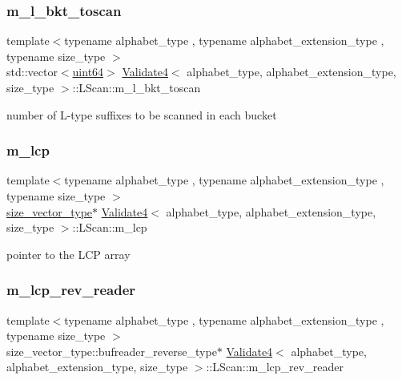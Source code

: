 \subsubsection{\texorpdfstring{m\+\_\+l\+\_\+bkt\+\_\+toscan}{m\_l\_bkt\_toscan}}
{\footnotesize\ttfamily template$<$typename alphabet\+\_\+type , typename alphabet\+\_\+extension\+\_\+type , typename size\+\_\+type $>$ \\
std\+::vector$<$\hyperlink{types_8h_a60e8696a4678cd348e991a1f172e53f7}{uint64}$>$ \hyperlink{class_validate4}{Validate4}$<$ alphabet\+\_\+type, alphabet\+\_\+extension\+\_\+type, size\+\_\+type $>$\+::L\+Scan\+::m\+\_\+l\+\_\+bkt\+\_\+toscan\hspace{0.3cm}{\ttfamily [private]}}



number of L-\/type suffixes to be scanned in each bucket 

\mbox{\label{struct_validate4_1_1_l_scan_af9ba74080cb7b3e0f685d29a4c78ab73}} 
\subsubsection{\texorpdfstring{m\+\_\+lcp}{m\_lcp}}
{\footnotesize\ttfamily template$<$typename alphabet\+\_\+type , typename alphabet\+\_\+extension\+\_\+type , typename size\+\_\+type $>$ \\
\hyperlink{class_validate4_a46ea31a0a4b23f583806792160421d15}{size\+\_\+vector\+\_\+type}$\ast$ \hyperlink{class_validate4}{Validate4}$<$ alphabet\+\_\+type, alphabet\+\_\+extension\+\_\+type, size\+\_\+type $>$\+::L\+Scan\+::m\+\_\+lcp\hspace{0.3cm}{\ttfamily [private]}}



pointer to the L\+CP array 

\mbox{\label{struct_validate4_1_1_l_scan_ad46060df61e67075c4dd51ef65b4fbe1}} 
\subsubsection{\texorpdfstring{m\+\_\+lcp\+\_\+rev\+\_\+reader}{m\_lcp\_rev\_reader}}
{\footnotesize\ttfamily template$<$typename alphabet\+\_\+type , typename alphabet\+\_\+extension\+\_\+type , typename size\+\_\+type $>$ \\
size\+\_\+vector\+\_\+type\+::bufreader\+\_\+reverse\+\_\+type$\ast$ \hyperlink{class_validate4}{Validate4}$<$ alphabet\+\_\+type, alphabet\+\_\+extension\+\_\+type, size\+\_\+type $>$\+::L\+Scan\+::m\+\_\+lcp\+\_\+rev\+\_\+reader\hspace{0.3cm}{\ttfamily [private]}}



